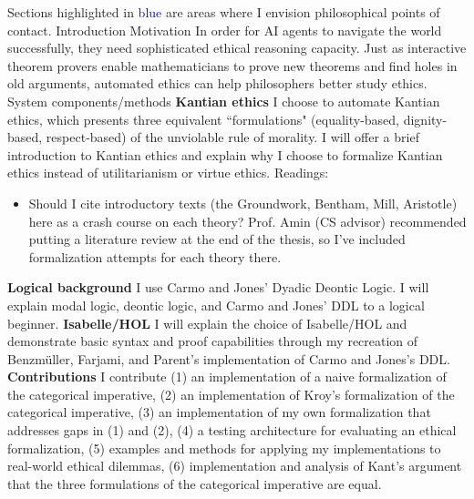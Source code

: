 \documentclass[11pt]{article}
\begin{document}
\begin{outline}[enumerate]
\1[Note: ] Sections highlighted in \textcolor{blue}{blue} are areas where I envision philosophical points of contact. 
\1[Chapter 1:] Introduction
\2 Motivation
\3 In order for AI agents to navigate the world successfully, they need sophisticated ethical reasoning capacity. 
\3 Just as interactive theorem provers enable mathematicians to prove new theorems and find holes in old arguments, automated ethics can help philosophers better study ethics.
\2 System components/methods \color{blue}
\3 \textbf{Kantian ethics} \color{black} I choose to automate Kantian ethics, which presents three equivalent ``formulations" (equality-based, dignity-based, respect-based) of the unviolable rule of morality. I will offer a brief introduction to Kantian ethics and explain why I choose to formalize Kantian ethics instead of utilitarianism or virtue ethics. 
Readings: \begin{itemize}
    \item Should I cite introductory texts (the Groundwork, Bentham, Mill, Aristotle) here as a crash course on each theory? Prof. Amin (CS advisor) recommended putting a literature review at the end of the thesis, so I've included formalization attempts for each theory there.
\end{itemize} \color{black}
\3 \textbf{Logical background} I use Carmo and Jones' Dyadic Deontic Logic. I will explain modal logic, deontic logic, and Carmo and Jones' DDL to a logical beginner. 
\3 \textbf{Isabelle/HOL} I will explain the choice of Isabelle/HOL and demonstrate basic syntax and proof capabilities through my recreation of Benzmüller, Farjami, and Parent's \cite{BFP} implementation of Carmo and Jones's DDL. 
\3 \textbf{Contributions} I contribute (1) an implementation of a naive formalization of the categorical imperative, (2) an implementation of Kroy's formalization of the categorical imperative, (3) an implementation of my own formalization that addresses gaps in (1) and (2), (4) a testing architecture for evaluating an ethical formalization, (5) examples and methods for applying my implementations to real-world ethical dilemmas, (6) implementation and analysis of Kant's argument that the three formulations of the categorical imperative are equal.


\end{outline}
\end{document}
